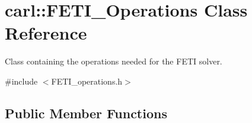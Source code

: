 \hypertarget{classcarl_1_1_f_e_t_i___operations}{}\section{carl\+:\+:F\+E\+T\+I\+\_\+\+Operations Class Reference}
\label{classcarl_1_1_f_e_t_i___operations}


Class containing the operations needed for the F\+E\+T\+I solver.  




{\ttfamily \#include $<$F\+E\+T\+I\+\_\+operations.\+h$>$}

\subsection*{Public Member Functions}
